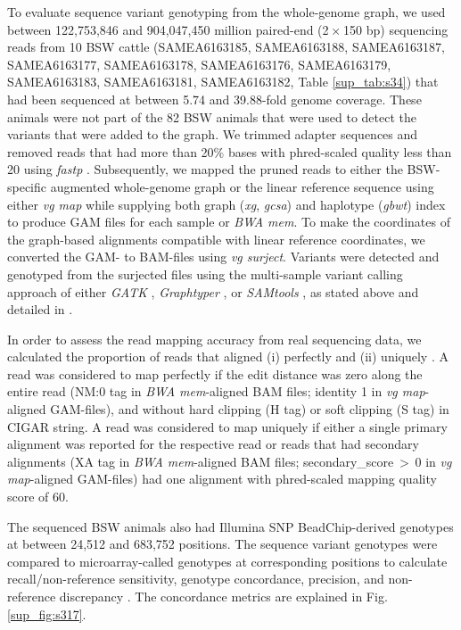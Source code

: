 \documentclass[../main.tex]{subfiles}
\begin{document}
To evaluate sequence variant genotyping from the whole-genome graph, we used between 122,753,846 and 904,047,450 million paired-end (2 × 150 bp) sequencing reads from 10 BSW cattle (SAMEA6163185, SAMEA6163188, SAMEA6163187, SAMEA6163177, SAMEA6163178, SAMEA6163176, SAMEA6163179, SAMEA6163183, SAMEA6163181, SAMEA6163182, Table \ref{sup_tab:s34}) that had been sequenced at between 5.74 and 39.88-fold genome coverage. These animals were not part of the 82 BSW animals that were used to detect the variants that were added to the graph. We trimmed adapter sequences and removed reads that had more than 20\% bases with phred-scaled quality less than 20 using \emph{fastp} \citep{chen2018fastp}. Subsequently, we mapped the pruned reads to either the BSW-specific augmented whole-genome graph or the linear reference sequence using either \emph{vg map} while supplying both graph (\emph{xg}, \emph{gcsa}) and haplotype (\emph{gbwt}) index to produce GAM files for each sample or \emph{BWA mem}. To make the coordinates of the graph-based alignments compatible with linear reference coordinates, we converted the GAM- to BAM-files using \emph{vg surject}. Variants were detected and genotyped from the surjected files using the multi-sample variant calling approach of either \emph{GATK} \citep{poplin2017scaling}, \emph{Graphtyper} \citep{eggertsson2017graphtyper}, or \emph{SAMtools} \citep{li2009sequence}, as stated above and detailed in \citep{crysnanto2019accurate}.

In order to assess the read mapping accuracy from real sequencing data, we calculated the proportion of reads that aligned (i) perfectly and (ii) uniquely \citep{pritt2018forge,shukla2019hg19kindel,novak2017genome}. A read was considered to map perfectly if the edit distance was zero along the entire read (NM:0 tag in \emph{BWA mem}-aligned BAM files; identity 1 in \emph{vg map}-aligned GAM-files), and without hard clipping (H tag) or soft clipping (S tag) in CIGAR string. A read was considered to map uniquely if either a single primary alignment was reported for the respective read or reads that had secondary alignments (XA tag in \emph{BWA mem}-aligned BAM files; secondary\_score $>$ 0 in \emph{vg map}-aligned GAM-files) had one alignment with phred-scaled mapping quality score of 60.

The sequenced BSW animals also had Illumina SNP BeadChip-derived genotypes at between 24,512 and 683,752 positions. The sequence variant genotypes were compared to microarray-called genotypes at corresponding positions to calculate recall/non-reference sensitivity, genotype concordance, precision, and non-reference discrepancy \citep{depristo2011framework,linderman2014analytical}. The concordance metrics are explained in Fig. \ref{sup_fig:s317}.
\end{document}
